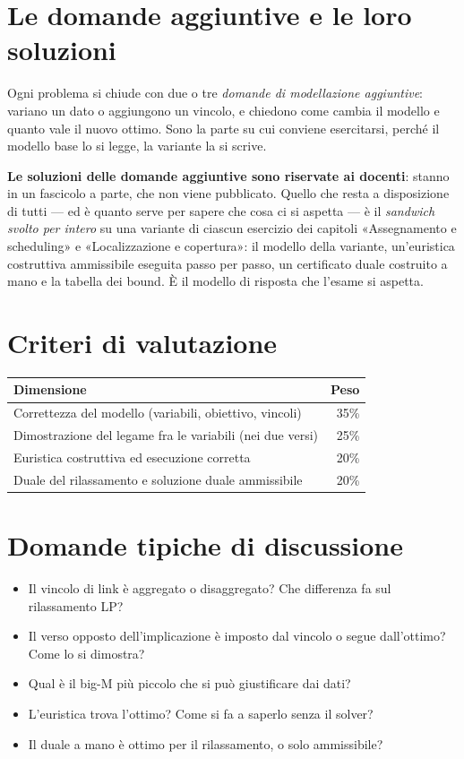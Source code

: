 \section{Le domande aggiuntive e le loro soluzioni}
Ogni problema si chiude con due o tre \emph{domande di modellazione aggiuntive}:
variano un dato o aggiungono un vincolo, e chiedono come cambia il modello e
quanto vale il nuovo ottimo. Sono la parte su cui conviene esercitarsi, perché
il modello base lo si legge, la variante la si scrive.

\textbf{Le soluzioni delle domande aggiuntive sono riservate ai docenti}: stanno
in un fascicolo a parte, che non viene pubblicato. Quello che resta a
disposizione di tutti --- ed è quanto serve per sapere che cosa ci si aspetta ---
è il \emph{sandwich svolto per intero} su una variante di ciascun esercizio dei
capitoli «Assegnamento e scheduling» e «Localizzazione e copertura»: il modello della
variante, un'euristica costruttiva ammissibile eseguita passo per passo, un
certificato duale costruito a mano e la tabella dei bound. È il modello di
risposta che l'esame si aspetta.

\section{Criteri di valutazione}

\begin{center}\small
\begin{tabular}{lr}
\toprule
Dimensione & Peso \\
\midrule
Correttezza del modello (variabili, obiettivo, vincoli) & 35\% \\
Dimostrazione del legame fra le variabili (nei due versi) & 25\% \\
Euristica costruttiva ed esecuzione corretta & 20\% \\
Duale del rilassamento e soluzione duale ammissibile & 20\% \\
\bottomrule
\end{tabular}
\end{center}

\section{Domande tipiche di discussione}
\begin{itemize}
\item Il vincolo di link è aggregato o disaggregato? Che differenza fa sul
      rilassamento LP?
\item Il verso opposto dell'implicazione è imposto dal vincolo o segue
      dall'ottimo? Come lo si dimostra?
\item Qual è il big-M più piccolo che si può giustificare dai dati?
\item L'euristica trova l'ottimo? Come si fa a saperlo senza il solver?
\item Il duale a mano è ottimo per il rilassamento, o solo ammissibile?
\end{itemize}

